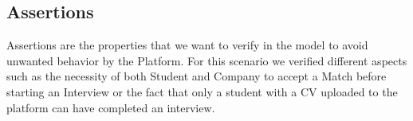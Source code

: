 \subsection{Assertions}
Assertions are the properties that we want to verify in the model to avoid unwanted behavior by the Platform. For this scenario we verified different aspects such as the necessity of both Student and Company to accept a Match before starting an Interview or the fact that only a student with a CV uploaded to the platform can have completed an interview.

